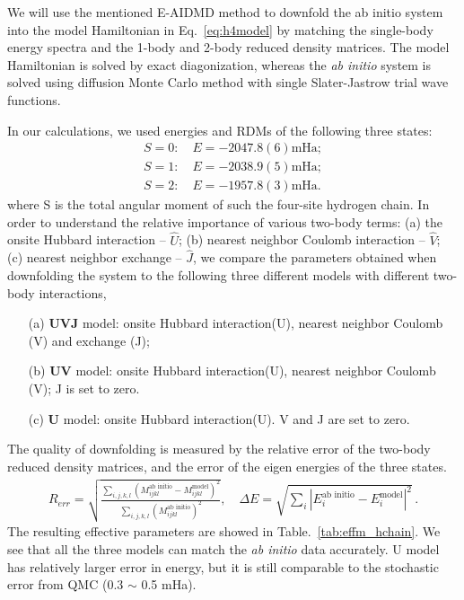 \documentclass[prl,12pt,onecolumn,nofootinbib,notitlepage,english,superscriptaddress]{revtex4-1}
\begin{document}
We will use the mentioned E-AIDMD method to downfold the ab initio system into the model Hamiltonian in Eq.~\eqref{eq:h4model} by matching the single-body energy spectra and the 1-body and 2-body reduced density matrices. The model Hamiltonian is solved by exact diagonization, whereas the \textit{ab initio} system is solved using diffusion Monte Carlo method with single Slater-Jastrow trial wave functions. 

In our calculations, we used energies and RDMs of the following three states:
\begin{subequations}
\begin{eqnarray}
S=0: \quad E = -2047.8(6) \text{mHa}; \\
S=1: \quad E = -2038.9(5) \text{mHa}; \\
S=2: \quad E = -1957.8(3) \text{mHa}.
\end{eqnarray}
\end{subequations}
where S is the total angular moment of such the four-site hydrogen chain. In order to understand the relative importance of various two-body terms: (a) the onsite Hubbard interaction -- $\hat U$; (b) nearest neighbor Coulomb interaction -- $\hat V$; (c) nearest neighbor exchange -- $\hat J$, we compare the parameters obtained when downfolding the system to the following three different models with different two-body interactions,
\begin{itemize}
\item [(a)] \textbf{UVJ} model: onsite Hubbard interaction(U), nearest neighbor Coulomb (V) and exchange (J);
\item [(b)] \textbf{UV} model: onsite Hubbard interaction(U), nearest neighbor Coulomb (V);  J is set to zero. 
\item [(c)] \textbf{U} model: onsite Hubbard interaction(U). V and J are set to zero. 
\end{itemize}

The quality of downfolding is measured by the relative error of the two-body reduced density matrices, and the error of the eigen energies of the three states.
\begin{eqnarray}
R_{err} =\sqrt{\frac{\sum_{i,j,k,l}(M_{ijkl}^\text{ab initio} - M_{ijkl}^\text{model})^{2}}{\sum_{i,j,k,l}(M^\text{ab initio}_{ijkl})^{2} }}, \quad
\Delta E = \sqrt{\sum_{i}|E_{i}^\text{ab initio} - E_{i}^{\text{model}}|^{2}}\,.
\end{eqnarray}
The resulting effective parameters are showed in Table.~\ref{tab:effm_hchain}. We see that all the three models can match the \textit{ab initio} data accurately. U model has relatively larger error in energy, but it is still comparable to the stochastic error from QMC (0.3 $\sim$ 0.5 mHa).
\end{document}
